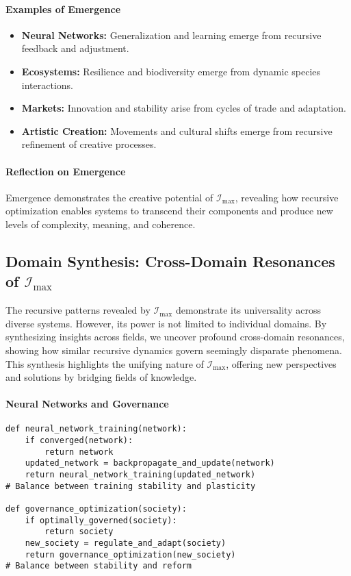 \documentclass[12pt]{article}
\begin{document}
\paragraph{Examples of Emergence}
\begin{itemize}
    \item \textbf{Neural Networks:} Generalization and learning emerge from recursive feedback and adjustment.
    \item \textbf{Ecosystems:} Resilience and biodiversity emerge from dynamic species interactions.
    \item \textbf{Markets:} Innovation and stability arise from cycles of trade and adaptation.
    \item \textbf{Artistic Creation:} Movements and cultural shifts emerge from recursive refinement of creative processes.
\end{itemize}

\paragraph{Reflection on Emergence}
Emergence demonstrates the creative potential of \(\mathcal{I}_{\text{max}}\), revealing how recursive optimization enables systems to transcend their components and produce new levels of complexity, meaning, and coherence.

\subsection{Domain Synthesis: Cross-Domain Resonances of \(\mathcal{I}_{\text{max}}\)}

The recursive patterns revealed by \(\mathcal{I}_{\text{max}}\) demonstrate its universality across diverse systems. However, its power is not limited to individual domains. By synthesizing insights across fields, we uncover profound cross-domain resonances, showing how similar recursive dynamics govern seemingly disparate phenomena. This synthesis highlights the unifying nature of \(\mathcal{I}_{\text{max}}\), offering new perspectives and solutions by bridging fields of knowledge.

\paragraph{Neural Networks and Governance}
\begin{verbatim}
def neural_network_training(network):
    if converged(network):
        return network
    updated_network = backpropagate_and_update(network)
    return neural_network_training(updated_network)
# Balance between training stability and plasticity

def governance_optimization(society):
    if optimally_governed(society):
        return society
    new_society = regulate_and_adapt(society)
    return governance_optimization(new_society)
# Balance between stability and reform
\end{verbatim}
\end{document}
